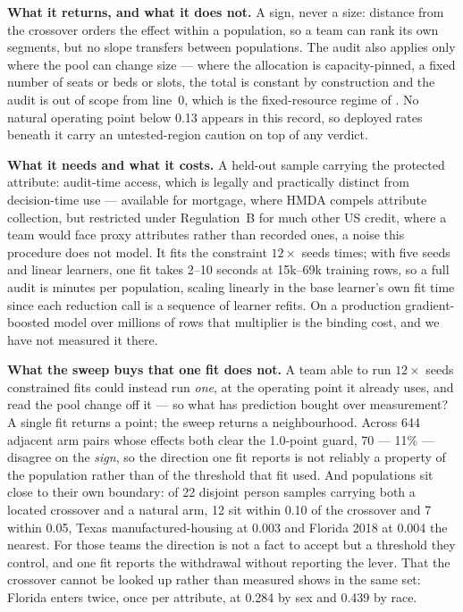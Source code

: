 \documentclass[conference]{IEEEtran}
\begin{document}
\textbf{What it returns, and what it does not.} A sign, never a size: distance from the
crossover orders the effect within a population, so a team can rank its own segments, but no
slope transfers between populations. The audit also applies only where the pool can change
size --- where the allocation is capacity-pinned, a fixed number of seats or beds or slots,
the total is constant by construction and the audit is out of scope from line~0, which is the
fixed-resource regime of \cite{goethals2024}. No natural operating point below 0.13 appears in
this record, so deployed rates beneath it carry an untested-region caution on top of any
verdict.

\textbf{What it needs and what it costs.} A held-out sample carrying the protected attribute:
audit-time access, which is legally and practically distinct from decision-time use --- available for mortgage, where HMDA compels attribute collection, but restricted under Regulation~B for much other US credit, where a team would face proxy attributes rather than recorded ones, a noise this procedure does not model. It fits the constraint $12 \times$ seeds
times; with five seeds and linear learners, one fit takes 2--10 seconds at 15k--69k training
rows, so a full audit is minutes per population, scaling linearly in the base learner's own
fit time since each reduction call is a sequence of learner refits. On a production
gradient-boosted model over millions of rows that multiplier is the binding cost, and we have
not measured it there.

\textbf{What the sweep buys that one fit does not.} A team able to run $12 \times$ seeds
constrained fits could instead run \emph{one}, at the operating point it already uses, and
read the pool change off it --- so what has prediction bought over measurement? A single fit
returns a point; the sweep returns a neighbourhood. Across 644 adjacent arm pairs whose effects both clear the 1.0-point guard, 70 --- 11\% --- disagree on the \emph{sign}, so the direction one fit reports is not reliably a property of the population rather than of the threshold that fit used. And populations sit close to their own boundary: of 22 disjoint person samples carrying both a located crossover and a natural arm, 12 sit within 0.10 of the crossover and 7 within 0.05, Texas manufactured-housing at 0.003 and Florida 2018 at 0.004 the nearest. For those teams the direction
is not a fact to accept but a threshold they control, and one fit reports the withdrawal
without reporting the lever. That the crossover cannot be looked up rather than measured shows
in the same set: Florida enters twice, once per attribute, at 0.284 by sex and 0.439 by race.
\end{document}
